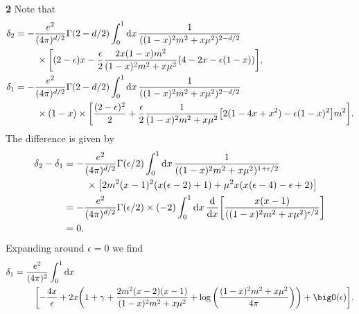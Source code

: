 \documentclass{article}
\makeatletter
\newcommand*{\shifttext}[1]{%
  \settowidth{\@tempdima}{#1}%
  \hspace{-\@tempdima}#1%
}
\newcommand{\plabel}[1]{%
\shifttext{\textbf{#1}\quad}%
}
\newcommand{\prule}{%
\begin{center}%
\hdashrule[0.5ex]{.99\linewidth}{1pt}{1pt 2.5pt}%
\end{center}%
}
\makeatother
\begin{document}
\prule

\plabel{2}%
Note that
\begin{align*}
    \delta_2 &= -\frac{e^2}{(4\pi)^{d/2}} \Gamma(2-d/2) \int_0^1 \dd{x} \frac{1}{((1-x)^2 m^2 + x\mu^2)^{2-d/2}} \\
    &{\phantom{{}={}}} \quad \times \qty[(2-\epsilon)x - \frac{\epsilon}{2}\frac{2x(1-x)m^2}{(1-x)^2 m^2 + x \mu^2}(4-2x-\epsilon(1-x))], \\
    \delta_1 &= -\frac{e^2}{(4\pi)^{d/2}} \Gamma(2-d/2) \int_0^1 \dd{x} \frac{1}{((1-x)^2 m^2 + x\mu^2)^{2-d/2}} \\
    &{\phantom{{}={}}} \quad \times (1-x) \times \qty[\frac{(2-\epsilon)^2}{2} + \frac{\epsilon}{2}\frac{1}{(1-x)^2m^2 + x\mu^2} \qty[2(1-4x+x^2) - \epsilon(1-x)^2]m^2].
\end{align*}
The difference is given by
\begin{align*}
    \delta_2 - \delta_1 &= -\frac{e^2}{(4\pi)^{d/2}} \Gamma(\epsilon/2) \int_0^1 \dd{x} \frac{1}{((1-x)^2 m^2 + x\mu^2)^{1+\epsilon/2}} \\
    &{\phantom{{}={}}} \quad \times \qty[2 m^2 (x-1)^2 (x (\epsilon -2)+1)+\mu ^2 x (x (\epsilon -4)-\epsilon +2)] \\
    &= -\frac{e^2}{(4\pi)^{d/2}} \Gamma(\epsilon/2) \times (-2) \int_0^1 \dd{x} \dv{x}\qty[\frac{x(x-1)}{((1-x)^2 m^2 + x\mu^2)^{\epsilon/2}}] \\
    &= 0.
\end{align*}
Expanding around $\epsilon=0$ we find
\begin{align*}
    \delta_1 &= \frac{e^2}{(4\pi)^2} \int_0^1 \dd{x} \\
    &{\phantom{{}={}}} \quad\qty[-\frac{4x}{\epsilon} + 2x\qty(1+\gamma+\frac{2m^2(x-2)(x-1)}{(1-x)^2m^2 + x\mu^2} + \log\qty(\frac{(1-x)^2m^2 + x\mu^2}{4\pi})) + \bigO(\epsilon)].
\end{align*}

\prule
\end{document}
